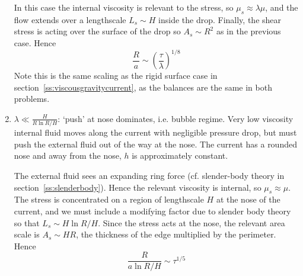 \documentclass{jknotes}
\begin{document}
\begin{enumerate}
\begin{center}
		\end{center}
		In this case the internal viscosity is relevant to the stress, so
		$\mu_s \approx \lambda \mu$, and the flow extends over a lengthscale
		$L_s \sim H$ inside the drop. Finally, the shear stress is acting over
		the surface of the drop so $A_s \sim R^2$ as in the previous case. Hence
		\begin{equation}
			\frac{R}{a} \sim \left( \frac{\tau}{\lambda}\right)^{1/8}
		\end{equation}
		Note this is the same scaling as the rigid surface case in
		section~\ref{ss:viscousgravitycurrent}, as the balances are the same
		in both problems.
	\item $\lambda \ll \frac{H}{R \ln R/H}$: `push' at nose dominates, i.e.
		bubble regime. Very low viscosity internal fluid moves along the
		current with negligible pressure drop, but must push the external
		fluid out of the way at the nose. The current has a rounded nose and
		away from the nose, $h$ is approximately constant.
		\begin{center}
		\end{center}
		The external fluid sees an expanding ring force (cf. slender-body
		theory in section~\ref{ss:slenderbody}). Hence the relevant viscosity
		is internal, so $\mu_s \approx \mu$. The stress is concentrated on a
		region of lengthscale $H$ at the nose of the current, and we must
		include a modifying factor due to slender body theory so that $L_s
		\sim H \ln R/H$. Since the stress acts at the nose, the relevant area
		scale is $A_s \sim HR$, the thickness of the edge multiplied by the
		perimeter. Hence
		\begin{equation}
			\frac{R}{a \ln R/H} \sim \tau^{1/5}
		\end{equation}
\end{enumerate}
\end{document}
